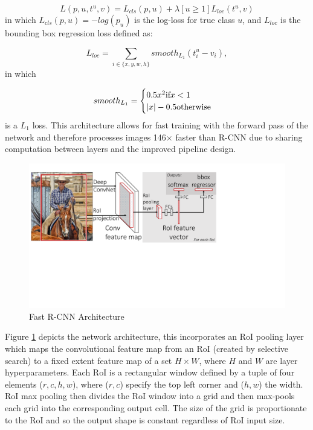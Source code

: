 \documentclass[11pt,twoside]{report}
\begin{document}
\begin{equation}
\label{multi-task_loss}
L(p,u,t^{u},v) = L_{cls}(p,u) + \lambda[u \geq 1]L_{loc}(t^{u},v)
\end{equation}
in which $L_{cls}(p,u) = -log(p_{u})$ is the log-loss for true class $u$, and $L_{loc}$ is the bounding box regression loss defined as:

\begin{equation}
\label{bbox_loss}
L_{loc} = \sum_{i\in \{x,y,w,h\}}smooth_{L_{1}}(t^{u}_{i}-v_{i}),
\end{equation}
in which

\begin{equation}
\label{multi-task_s}
smooth_{L_{1}} = 
\begin{cases}
0.5x^{2} \textnormal{if} x < 1 \\
|x| - 0.5  \textnormal{otherwise} \\
\end{cases}
\end{equation}
is a $L_{1}$ loss. This architecture allows for fast training with the forward pass of the network and therefore processes images 146$\times$ faster than R-CNN due to sharing computation between layers and the improved pipeline design. 

\noindent \begin{figure}[h!]
	\includegraphics[trim={0 22em 22em 3em},clip,width = 1.0\hsize]{./figures/arch.pdf}
	\caption{Fast R-CNN Architecture \cite{DBLP:journals/corr/Girshick15}}
	\label{Fast_RNN_fig}
\end{figure}

Figure \ref{Fast_RNN_fig} depicts the network architecture, this incorporates an RoI pooling layer which maps the convolutional feature map from an RoI (created by selective search) to a fixed extent feature map of a set $H \times W$, where $H$ and $W$ are layer hyperparameters. Each RoI is a rectangular window defined by a tuple of four elements ($r,c,h,w$), where ($r,c$) specify the top left corner and ($h,w$) the width. RoI max pooling then divides the RoI window into a grid and then max-pools each grid into the corresponding output cell. The size of the grid is proportionate to the RoI and so the output shape is constant regardless of RoI input size. 
\end{document}
